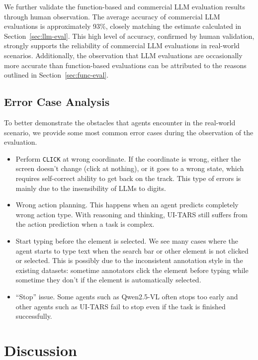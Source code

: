 \documentclass[11pt]{article}
\begin{document}
We further validate the function-based and commercial LLM evaluation results through human observation. The average accuracy of commercial LLM evaluations is approximately 93\%, closely matching the estimate calculated in Section~\ref{sec:llm-eval}. This high level of accuracy, confirmed by human validation, strongly supports the reliability of commercial LLM evaluations in real-world scenarios. Additionally, the observation that LLM evaluations are occasionally more accurate than function-based evaluations can be attributed to the reasons outlined in Section~\ref{sec:func-eval}.


\subsection{Error Case Analysis}

To better demonstrate the obstacles that agents encounter in the real-world scenario, we provide some most common error cases during the observation of the evaluation.

\begin{itemize}[leftmargin=5mm]
    \item Perform \texttt{CLICK} at wrong coordinate. If the coordinate is wrong, either the screen doesn't change (click at nothing), or it goes to a wrong state, which requires self-correct ability to get back on the track. This type of errors is mainly due to the insensibility of LLMs to digits.
    \item Wrong action planning. This happens when an agent predicts completely wrong action type. With reasoning and thinking, UI-TARS still suffers from the action prediction when a task is complex.
    \item Start typing before the element is selected. We see many cases where the agent starts to type text when the search bar or other element is not clicked or selected. This is possibly due to the inconsistent annotation style in the existing datasets: sometime annotators click the element before typing while sometime they don't if the element is automatically selected.
    \item ``Stop'' issue. Some agents such as Qwen2.5-VL often stops too early and other agents such as UI-TARS fail to stop even if the task is finished successfully.
\end{itemize}


\section{Discussion}
\end{document}
